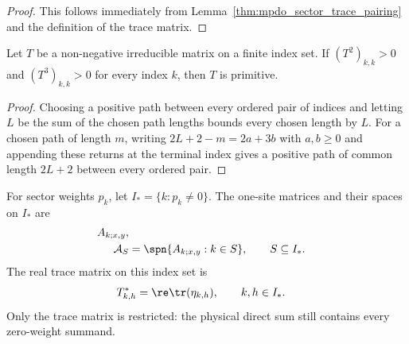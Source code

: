 \begin{proof}
    \leanok
    This follows immediately from Lemma~\ref{thm:mpdo_sector_trace_pairing}
    and the definition of the trace matrix.
\end{proof}

\begin{lemma}%
    \label{thm:matrix_primitive_of_two_three_returns}
    \leanok
    Let $T$ be a non-negative irreducible matrix on a finite index set. If
    $(T^2)_{k,k}>0$ and $(T^3)_{k,k}>0$ for every index $k$, then $T$ is
    primitive.
\end{lemma}

\begin{proof}
    \leanok
    Choosing a positive path between every ordered pair of indices and letting
    $L$ be the sum of the chosen path lengths bounds every chosen length by
    $L$. For a chosen path of length $m$, writing $2L+2-m=2a+3b$ with
    $a,b\geq0$ and appending these returns at the terminal index gives a
    positive path of common length $2L+2$ between every ordered pair.
\end{proof}

\begin{definition}%
    \label{def:mpdo_active_sector_trace_matrix}
    \leanok
    For sector weights $p_k$, let $I_*=\{k:p_k\ne0\}$. The one-site matrices
    and their spaces on $I_*$ are
    \begin{align}
        A_{k;x,y},
        \notag                        \\
        {\cal A}_S
         & =\spn\{A_{k;x,y}:k\in S\},
        \qquad S\subseteq I_*.
        \notag
    \end{align}
    The real trace matrix on this index set is
    \begin{align}
        T^*_{k,h}
         & =\re\tr(\eta_{k,h}),
        \qquad k,h\in I_*.
        \notag
    \end{align}
    Only the trace matrix is restricted: the physical direct sum still
    contains every zero-weight summand.
\end{definition}


